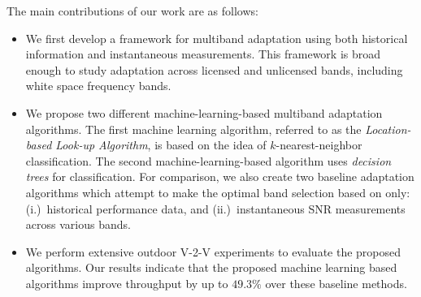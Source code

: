 The main contributions of our work are as follows:
\begin{itemize}
\item We first develop a framework for multiband adaptation using both historical information and instantaneous measurements. This framework is broad enough to study adaptation across licensed and unlicensed bands, including white space frequency bands.  

\item We propose two different machine-learning-based multiband adaptation algorithms. The 
first machine learning algorithm, referred to as the \emph{Location-based 
Look-up Algorithm}, 
is based on the idea of $k$-nearest-neighbor classification. The second machine-learning-based 
algorithm uses \emph{decision trees} for classification. 
For comparison, we also create two baseline adaptation algorithms which attempt to make the optimal band selection based on only: (i.)~historical 
performance data, and (ii.)~instantaneous SNR measurements across 
various bands. 



\item We perform extensive outdoor V-2-V experiments to evaluate the proposed algorithms.
Our results indicate that the proposed machine learning based algorithms improve
throughput by up to $49.3\%$ over these baseline methods.

\end{itemize}





